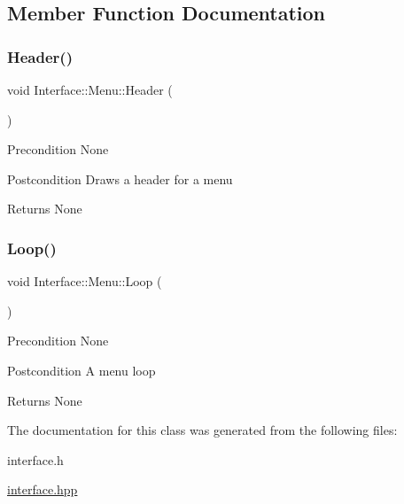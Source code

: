 \subsection{Member Function Documentation}
\mbox{\label{classInterface_1_1Menu_ac9c262f57118f3b3043bed327f195c00}} 
\subsubsection{\texorpdfstring{Header()}{Header()}}
{\footnotesize\ttfamily void Interface\+::\+Menu\+::\+Header (\begin{DoxyParamCaption}{ }\end{DoxyParamCaption})}

\begin{DoxyPrecond}{Precondition}
None 
\end{DoxyPrecond}
\begin{DoxyPostcond}{Postcondition}
Draws a header for a menu 
\end{DoxyPostcond}
\begin{DoxyReturn}{Returns}
None 
\end{DoxyReturn}
\mbox{\label{classInterface_1_1Menu_ac6e7791ff9ffb233d07e05653a4f5bb2}} 
\subsubsection{\texorpdfstring{Loop()}{Loop()}}
{\footnotesize\ttfamily void Interface\+::\+Menu\+::\+Loop (\begin{DoxyParamCaption}{ }\end{DoxyParamCaption})}

\begin{DoxyPrecond}{Precondition}
None 
\end{DoxyPrecond}
\begin{DoxyPostcond}{Postcondition}
A menu loop 
\end{DoxyPostcond}
\begin{DoxyReturn}{Returns}
None 
\end{DoxyReturn}


The documentation for this class was generated from the following files\+:\begin{DoxyCompactItemize}
\item 
interface.\+h\item 
\hyperlink{interface_8hpp}{interface.\+hpp}\end{DoxyCompactItemize}
